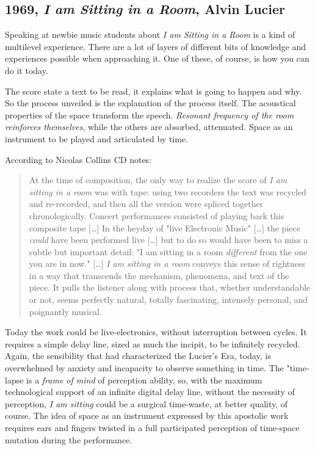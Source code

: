 \documentclass[twoside,a4paper]{article}
\begin{document}
\subsection{1969, \emph{I am Sitting in a Room}, Alvin Lucier}

Speaking at newbie music students about \emph{I am Sitting in a Room} is a kind of multilevel experience. There are a lot of layers of different bits of knowledge and experiences possible when approaching it. One of these, of course, is how you can do it today. 

The score state a text to be read, it explains what is going to happen and why. So the process unveiled is the explanation of the process itself. The acoustical properties of the space transform the speech. \emph{Resonant frequency of the room reinforces themselves}, while the others are absorbed, attenuated. Space as an instrument to be played and articulated by time. 

According to Nicolas Collins CD notes\cite{alCD90}:

\begin{quote}
At the time of composition, the only way to realize the score of \emph{I am sitting in a room} was with tape: using two recorders the text was recycled and re-recorded, and then all the version were spliced together chronologically. Concert performances consisted of playing back this composite tape [\ldots] In the heyday of "live Electronic Music" [\ldots] the piece \emph{could} have been performed live [\ldots] but to do so would have been to miss a subtle but important detail: "I am sitting in a room \emph{different} from the one you are in now." [\ldots] \emph{I am sitting in a room} conveys this sense of rightness in a way that transcends the mechanism, phenomena, and text of the piece. It pulls the listener along with process that, whether understandable or not, seems perfectly natural, totally fascinating, intensely personal, and poignantly musical. 
\end{quote}

Today the work could be live-electronics, without interruption between cycles. It requires a simple delay line, sized as much the incipit, to be infinitely recycled. Again, the sensibility that had characterized the Lucier's Era, today, is overwhelmed by anxiety and incapacity to observe something in time. The "time-lapse is a \emph{frame of mind} of perception ability, so, with the maximum technological support of an infinite digital delay line, without the necessity of perception, \emph{I am sitting} could be a surgical time-waste, at better quality, of course. The idea of space as an instrument expressed by this apostolic work requires ears and fingers twisted in a full participated perception of time-space mutation during the performance. 
\end{document}
